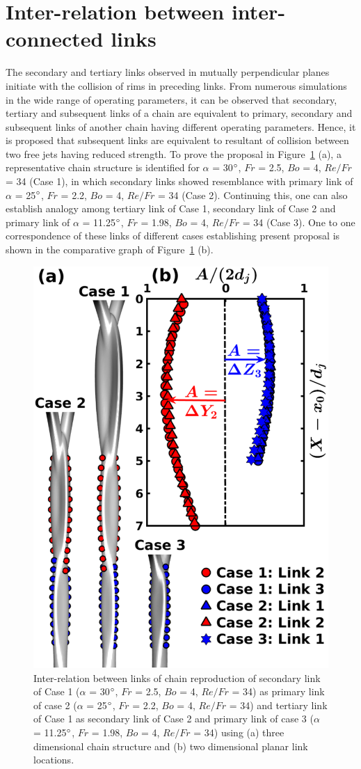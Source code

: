\section{Inter-relation between inter-connected links}
The secondary and tertiary links observed in mutually perpendicular planes initiate with the collision of rims in preceding links. From numerous simulations in the wide range of operating parameters, it can be observed that secondary, tertiary and subsequent links of a chain are equivalent to primary, secondary and subsequent links of another chain having different operating parameters. Hence, it is proposed that subsequent links are equivalent to resultant of collision between two free jets having reduced strength. To prove the proposal in Figure~\ref{Figure::secondCollision} (a), a representative chain structure is identified for $\alpha$ = 30$\degree$, $Fr$ = 2.5, $Bo$ = 4, $Re/Fr$ = 34 (Case 1), in which secondary links showed resemblance with primary link of $\alpha$ = 25$\degree$, $Fr$ = 2.2, $Bo$ = 4, $Re/Fr$ = 34 (Case 2). Continuing this, one can also establish analogy among tertiary link of Case 1, secondary link of Case 2 and primary link of $\alpha$ = 11.25$\degree$, $Fr$ = 1.98, $Bo$ = 4, $Re/Fr$ = 34 (Case 3). One to one correspondence of these links of different cases establishing present proposal is shown in the comparative graph of Figure~\ref{Figure::secondCollision} (b). \\
\begin{figure}[t]
	\centering
	\includegraphics[width=0.6\linewidth]{chapters/jetJet/Figure11}
	\caption{Inter-relation between links of chain reproduction of secondary link of Case 1 ($\alpha$ = 30$\degree$, $Fr$ = 2.5, $Bo$ = 4, $Re/Fr$ = 34) as primary link of case 2 ($\alpha$ = 25$\degree$, $Fr$ = 2.2, $Bo$ = 4, $Re/Fr$ = 34) and tertiary link of Case 1 as secondary link of Case 2 and primary link of case 3 ($\alpha$ = 11.25$\degree$, $Fr$ = 1.98, $Bo$ = 4, $Re/Fr$ = 34) using (a) three dimensional chain structure and (b) two dimensional planar link locations.}
	\label{Figure::secondCollision}
\end{figure}
